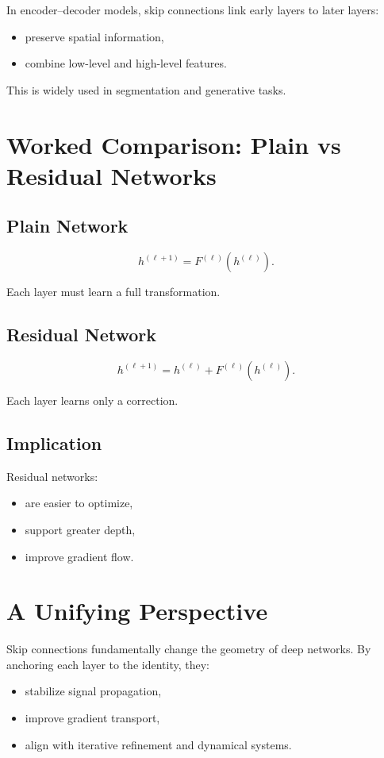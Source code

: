 In encoder--decoder models, skip connections link early layers to later layers:
\begin{itemize}
    \item preserve spatial information,
    \item combine low-level and high-level features.
\end{itemize}

This is widely used in segmentation and generative tasks.

\section{Worked Comparison: Plain vs Residual Networks}

\subsection{Plain Network}

\[
h^{(\ell+1)} = F^{(\ell)}(h^{(\ell)}).
\]

Each layer must learn a full transformation.

\subsection{Residual Network}

\[
h^{(\ell+1)} = h^{(\ell)} + F^{(\ell)}(h^{(\ell)}).
\]

Each layer learns only a correction.

\subsection{Implication}

Residual networks:
\begin{itemize}
    \item are easier to optimize,
    \item support greater depth,
    \item improve gradient flow.
\end{itemize}

\section{A Unifying Perspective}

Skip connections fundamentally change the geometry of deep networks. By anchoring each layer to the identity, they:
\begin{itemize}
    \item stabilize signal propagation,
    \item improve gradient transport,
    \item align with iterative refinement and dynamical systems.
\end{itemize}

